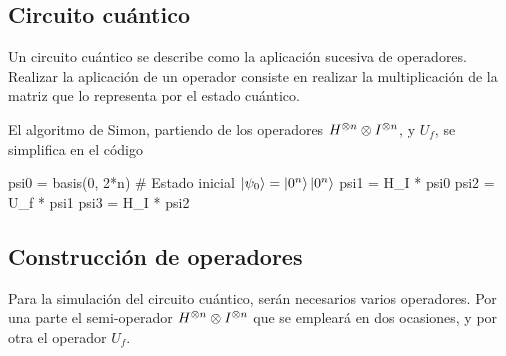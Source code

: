 %

\subsection{Circuito cuántico}
Un circuito cuántico se describe como la aplicación sucesiva de operadores.  
Realizar la aplicación de un operador consiste en realizar la multiplicación de 
la matriz que lo representa por el estado cuántico.

El algoritmo de Simon, partiendo de los operadores ${H}^{\otimes n} \otimes {I}^{\otimes n}$, 
y $U_f$, se simplifica en el código
%
\begin{pycode}
psi0 = basis(0, 2*n) # Estado inicial $\ket{\psi_{0}} = \ket{0^n}\ket{0^n}$
psi1 = H_I * psi0
psi2 = U_f * psi1
psi3 = H_I * psi2
\end{pycode}
\subsection{Construcción de operadores}
Para la simulación del circuito cuántico, serán necesarios varios operadores.
Por una parte el semi-operador ${H}^{\otimes n} \otimes {I}^{\otimes n}$ que se empleará en 
dos ocasiones, y por otra el operador $U_f$.


